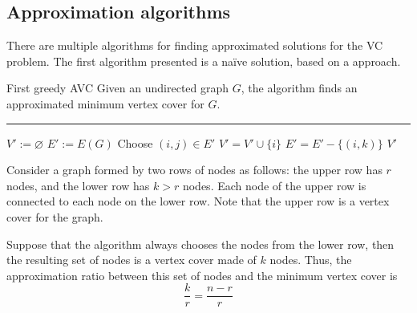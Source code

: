 \documentclass[a4paper, 12pt]{report}
\begin{document}
    \subsection{Approximation algorithms}

    There are multiple algorithms for finding approximated solutions for the VC problem. The first algorithm presented is a naïve solution, based on a  approach.

    \begin{framedalgo}[label={alg:first_greedy_avc}]{First greedy AVC}
        Given an undirected graph $G$, the algorithm finds an approximated minimum vertex cover for $G$. \\
        \hrule

        \quad
        \begin{algorithmic}[1]
                \State $V' := \varnothing$
                \State $E' := E(G)$
                    \State Choose $(i, j) \in E'$
                    \State $V' = V' \cup \{i\}$
                     
                        \State $E' = E' - \{(i, k)\}$
                    \EndFor
                \EndWhile
                \State {} $V'$
            \EndFunction
        \end{algorithmic}
    \end{framedalgo}



    Consider a graph formed by two rows of nodes as follows: the upper row has $r$ nodes, and the lower row has $k > r$ nodes. Each node of the upper row is connected to each node on the lower row. Note that the upper row is a  vertex cover for the graph.

    Suppose that the algorithm always chooses the nodes from the lower row, then the resulting set of nodes is a vertex cover made of $k$ nodes. Thus, the approximation ratio between this set of nodes and the minimum vertex cover is $$\dfrac{k}{r} = \dfrac{n - r}{r}$$
   
\end{document}
